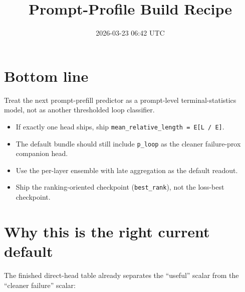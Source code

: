 \documentclass[11pt]{article}
\title{Prompt-Profile Build Recipe}
\author{}
\date{2026-03-23 06:42 UTC}
\begin{document}
\maketitle

\section*{Bottom line}
Treat the next prompt-prefill predictor as a prompt-level terminal-statistics model,
not as another thresholded loop classifier.

\begin{itemize}[leftmargin=1.5em]
\item If exactly one head ships, ship \texttt{mean\_relative\_length = E[L / E]}.
\item The default bundle should still include \texttt{p\_loop} as the cleaner
failure-prox companion head.
\item Use the per-layer ensemble with late aggregation as the default readout.
\item Ship the ranking-oriented checkpoint (\texttt{best\_rank}), not the loss-best checkpoint.
\end{itemize}

\section*{Why this is the right current default}
The finished direct-head table already separates the ``useful'' scalar from the
``cleaner failure'' scalar:
\end{document}
